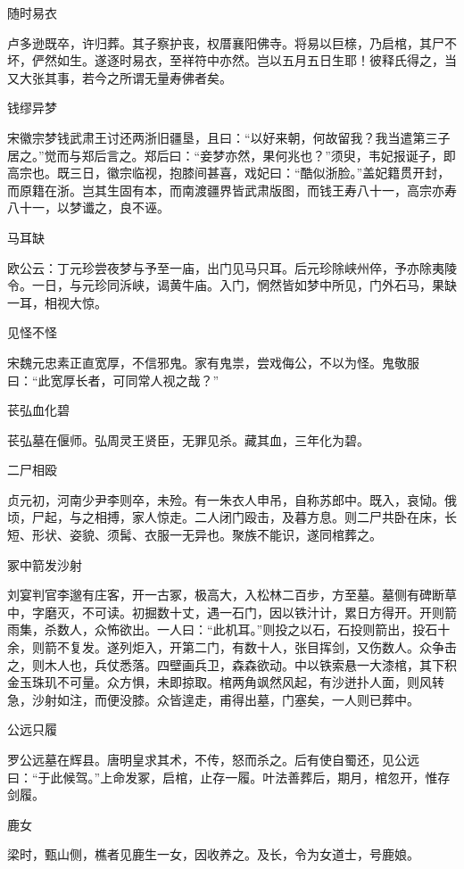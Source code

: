 \documentclass[a4paper,12pt,UTF8,twoside]{ctexbook}
\begin{document}
    随时易衣
    
    卢多逊既卒，许归葬。其子察护丧，权厝襄阳佛寺。将易以巨榇，乃启棺，其尸不坏，俨然如生。遂逐时易衣，至祥符中亦然。岂以五月五日生耶！彼释氏得之，当又大张其事，若今之所谓无量寿佛者矣。
    
    钱缪异梦
    
    宋徽宗梦钱武肃王讨还两浙旧疆垦，且曰：“以好来朝，何故留我？我当遣第三子居之。”觉而与郑后言之。郑后曰：“妾梦亦然，果何兆也？”须臾，韦妃报诞子，即高宗也。既三日，徽宗临视，抱膝间甚喜，戏妃曰：“酷似浙脸。”盖妃籍贯开封，而原籍在浙。岂其生固有本，而南渡疆界皆武肃版图，而钱王寿八十一，高宗亦寿八十一，以梦谶之，良不诬。
    
    马耳缺
    
    欧公云：丁元珍尝夜梦与予至一庙，出门见马只耳。后元珍除峡州倅，予亦除夷陵令。一日，与元珍同泝峡，谒黄牛庙。入门，惘然皆如梦中所见，门外石马，果缺一耳，相视大惊。
    
    见怪不怪
    
    宋魏元忠素正直宽厚，不信邪鬼。家有鬼祟，尝戏侮公，不以为怪。鬼敬服曰：“此宽厚长者，可同常人视之哉？”
    
    苌弘血化碧
    
    苌弘墓在偃师。弘周灵王贤臣，无罪见杀。藏其血，三年化为碧。
    
    二尸相殴
    
    贞元初，河南少尹李则卒，未殓。有一朱衣人申吊，自称苏郎中。既入，哀恸。俄顷，尸起，与之相搏，家人惊走。二人闭门殴击，及暮方息。则二尸共卧在床，长短、形状、姿貌、须髯、衣服一无异也。聚族不能识，遂同棺葬之。
    
    冢中箭发沙射
    
    刘宴判官李邈有庄客，开一古冢，极高大，入松林二百步，方至墓。墓侧有碑断草中，字磨灭，不可读。初掘数十丈，遇一石门，因以铁汁计，累日方得开。开则箭雨集，杀数人，众怖欲出。一人曰：“此机耳。”则投之以石，石投则箭出，投石十余，则箭不复发。遂列炬入，开第二门，有数十人，张目挥剑，又伤数人。众争击之，则木人也，兵仗悉落。四壁画兵卫，森森欲动。中以铁索悬一大漆棺，其下积金玉珠玑不可量。众方惧，未即掠取。棺两角飒然风起，有沙迸扑人面，则风转急，沙射如注，而便没膝。众皆遑走，甫得出墓，门塞矣，一人则已葬中。
    
    公远只履
    
    罗公远墓在辉县。唐明皇求其术，不传，怒而杀之。后有使自蜀还，见公远曰：“于此候驾。”上命发冢，启棺，止存一履。叶法善葬后，期月，棺忽开，惟存剑履。
    
    鹿女
    
    梁时，甄山侧，樵者见鹿生一女，因收养之。及长，令为女道士，号鹿娘。
    
\end{document}
